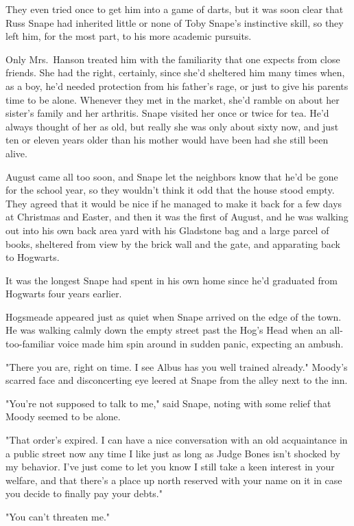 They even tried once to get him into a game of darts, but it was soon clear that Russ Snape had inherited little or none of Toby Snape's instinctive skill, so they left him, for the most part, to his more academic pursuits.

Only Mrs.~Hanson treated him with the familiarity that one expects from close friends. She had the right, certainly, since she'd sheltered him many times when, as a boy, he'd needed protection from his father's rage, or just to give his parents time to be alone. Whenever they met in the market, she'd ramble on about her sister's family and her arthritis. Snape visited her once or twice for tea. He'd always thought of her as old, but really she was only about sixty now, and just ten or eleven years older than his mother would have been had she still been alive.

August came all too soon, and Snape let the neighbors know that he'd be gone for the school year, so they wouldn't think it odd that the house stood empty. They agreed that it would be nice if he managed to make it back for a few days at Christmas and Easter, and then it was the first of August, and he was walking out into his own back area yard with his Gladstone bag and a large parcel of books, sheltered from view by the brick wall and the gate, and apparating back to Hogwarts.

It was the longest Snape had spent in his own home since he'd graduated from Hogwarts four years earlier.

Hogsmeade appeared just as quiet when Snape arrived on the edge of the town. He was walking calmly down the empty street past the Hog's Head when an all-too-familiar voice made him spin around in sudden panic, expecting an ambush.

"There you are, right on time. I see Albus has you well trained already." Moody's scarred face and disconcerting eye leered at Snape from the alley next to the inn.

"You're not supposed to talk to me," said Snape, noting with some relief that Moody seemed to be alone.

"That order's expired. I can have a nice conversation with an old acquaintance in a public street now any time I like just as long as Judge Bones isn't shocked by my behavior. I've just come to let you know I still take a keen interest in your welfare, and that there's a place up north reserved with your name on it in case you decide to finally pay your debts."

"You can't threaten me."

